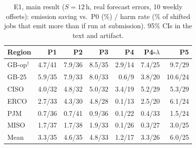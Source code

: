 \begin{table}[t]
\caption{E1, main result ($S{=}12$\,h, real forecast errors, 10 weekly offsets): emission saving vs.\ P0 (\%) /
harm rate (\% of shifted jobs that emit more than if run at submission). 95\% CIs in the text and artifact.}
\label{tab:main}
\centering\scriptsize\setlength{\tabcolsep}{2.5pt}
\begin{tabular}{lrrrrrr}
\toprule
Region & P1 & P2 & P3 & P4 & P4-$\lambda$ & P5 \\
\midrule
GB-op$^\dagger$ & 4.7/41 & 7.9/36 & 8.5/35 & 2.9/14 & 7.4/25 & 9.7/29 \\
GB-25 & 5.9/35 & 7.9/33 & 8.0/33 & 0.6/9 & 3.8/20 & 10.6/24 \\
CISO & 4.0/32 & 4.8/32 & 5.0/32 & 3.4/19 & 5.2/29 & 5.3/29 \\
ERCO & 2.7/33 & 4.3/30 & 4.8/28 & 0.1/13 & 2.5/20 & 6.1/24 \\
PJM & 0.7/36 & 0.7/41 & 0.9/36 & 0.1/22 & 0.4/33 & 1.5/24 \\
MISO & 1.7/37 & 1.7/38 & 1.9/33 & 0.1/26 & 0.3/27 & 3.0/25 \\
\midrule
Mean & 3.3/35 & 4.6/35 & 4.8/33 & 1.2/17 & 3.3/26 & 6.0/25 \\
\bottomrule
\end{tabular}
\end{table}
